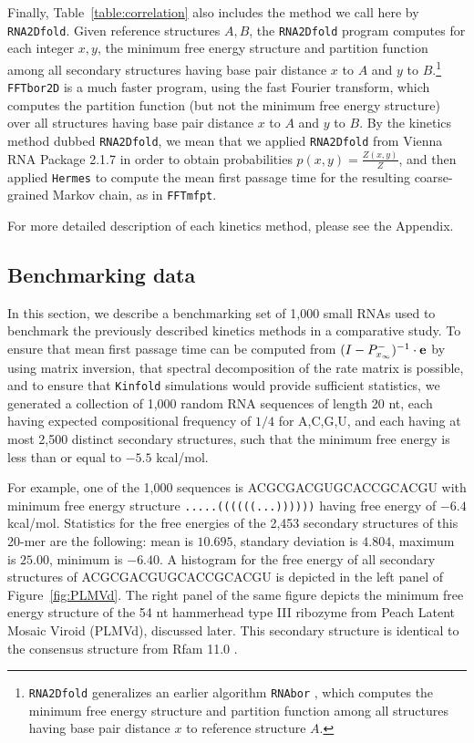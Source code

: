 Finally, Table~\ref{table:correlation}
also includes the method we call here by {\tt RNA2Dfold}.
Given reference structures $A,B$, the {\tt RNA2Dfold}  program
\cite{hofacker:RNAbor2D,Lorenz.amb11} computes for each integer
$x,y$, the minimum free energy structure and partition function
among all secondary structures having base pair distance $x$ to $A$
and $y$ to $B$.\footnote{{\tt RNA2Dfold} generalizes an earlier algorithm
{\tt RNAbor} \cite{Freyhult.b07,Freyhult.nar07}, which computes the
minimum free energy structure and partition function among all structures
having base pair distance $x$ to reference structure $A$.}
{\tt FFTbor2D} \cite{Senter.jmb14} is a much faster program, using the
fast Fourier transform, which
computes the partition function (but not the minimum free energy
structure) over all structures having base pair distance $x$ to $A$ and
$y$ to $B$. By the kinetics method dubbed
{\tt RNA2Dfold}, we mean that we applied
{\tt RNA2Dfold} from Vienna RNA Package 2.1.7
\cite{hofacker:RNAbor2D,Lorenz.amb11} in order
to obtain probabilities $p(x,y) = \frac{Z(x,y)}{Z}$,
and then applied {\tt Hermes} to compute the mean first passage time for
the resulting coarse-grained Markov chain, as in {\tt FFTmfpt}.

For more detailed description of each kinetics method, please see
the Appendix.

\subsection{Benchmarking data}

In this section, we describe a
benchmarking set of 1,000 small RNAs used to benchmark the previously
described kinetics methods in a comparative study. To ensure that mean
first passage time can be computed from
$(I - P^{-}_{x_{\infty}})^{-1} \cdot {\bf e}$ by using matrix
inversion, that spectral decomposition of the rate matrix is possible,
and to ensure that {\tt Kinfold} simulations would provide sufficient
statistics, we generated a collection of 1,000 random RNA sequences of
length 20 nt, each having expected compositional frequency of $1/4$
for A,C,G,U, and each having at most 2,500 distinct secondary
structures, such that the minimum free energy is less than or equal to
$-5.5$ kcal/mol.

For example, one of the 1,000 sequences is ACGCGACGUGCACCGCACGU with
minimum free energy structure {\tt .....((((((...))))))} having free
energy of $-6.4$ kcal/mol. Statistics for the free energies of the
2,453 secondary structures of this 20-mer are the following: mean is
$10.695$, standary deviation is $4.804$, maximum is $25.00$, minimum
is $-6.40$. A histogram for the free energy of all secondary
structures of ACGCGACGUGCACCGCACGU is depicted in
the left panel of Figure~\ref{fig:PLMVd}. The right panel of the
same figure depicts the minimum free energy structure of the
54 nt hammerhead type III ribozyme from Peach Latent Mosaic Viroid
(PLMVd), discussed later. This secondary structure is identical
to the consensus structure from Rfam 11.0 \cite{Gardner.nar11}.


